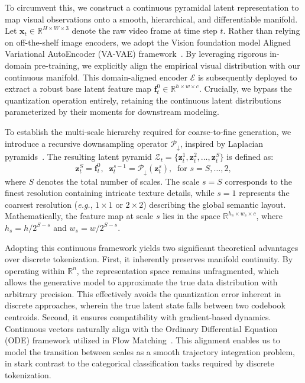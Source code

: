 To circumvent this, we construct a continuous pyramidal latent representation to map visual observations onto a smooth, hierarchical, and differentiable manifold. 
Let $\boldsymbol{x}_t \in \mathbb{R}^{H \times W \times 3}$ denote the raw video frame at time step $t$. Rather than relying on off-the-shelf image encoders, we adopt the Vision foundation model Aligned Variational AutoEncoder (VA-VAE) framework~\cite{yao2025reconstruction}. By leveraging rigorous in-domain pre-training, we explicitly align the empirical visual distribution with our continuous manifold. This domain-aligned encoder $\mathcal{E}$ is subsequently deployed to extract a robust base latent feature map $\boldsymbol{f}_t^0 \in \mathbb{R}^{h \times w \times c}$. 
Crucially, we bypass the quantization operation entirely, retaining the continuous latent distributions parameterized by their moments for downstream modeling.

To establish the multi-scale hierarchy required for coarse-to-fine generation, we introduce a recursive downsampling operator $\mathcal{P}_{\downarrow}$, inspired by Laplacian pyramids~\cite{denton2015deep}. The resulting latent pyramid $\mathcal{Z}_t = \{ \boldsymbol{z}_t^1, \boldsymbol{z}_t^2, \dots, \boldsymbol{z}_t^S \}$ is defined as:
\begin{equation}
    \boldsymbol{z}_t^S = \boldsymbol{f}_t^0, \;\; \boldsymbol{z}_t^{s-1} = \mathcal{P}_{\downarrow}(\boldsymbol{z}_t^s), \;\; \text{for } s = S, \dots, 2,
\end{equation}
where $S$ denotes the total number of scales. The scale $s=S$ corresponds to the finest resolution containing intricate texture details, while $s=1$ represents the coarsest resolution (\textit{e.g.}, $1 \times 1$ or $2 \times 2$) describing the global semantic layout. Mathematically, the feature map at scale $s$ lies in the space $\mathbb{R}^{h_s \times w_s \times c}$, where $h_s = h / 2^{S-s}$ and $w_s = w / 2^{S-s}$.

Adopting this continuous framework yields two significant theoretical advantages over discrete tokenization. First, it inherently preserves manifold continuity. By operating within $\mathbb{R}^n$, the representation space remains unfragmented, which allows the generative model to approximate the true data distribution with arbitrary precision. This effectively avoids the quantization error inherent in discrete approaches, wherein the true latent state falls between two codebook centroids. Second, it ensures compatibility with gradient-based dynamics. Continuous vectors naturally align with the Ordinary Differential Equation (ODE) framework utilized in Flow Matching~\cite{chen2018neural, lipman2023flow}. This alignment enables us to model the transition between scales as a smooth trajectory integration problem, in stark contrast to the categorical classification tasks required by discrete tokenization.

